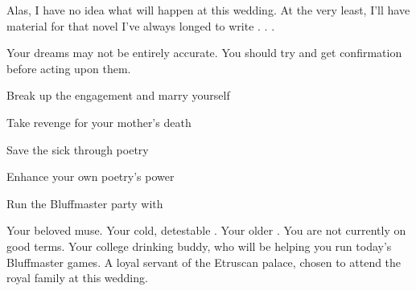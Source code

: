 \documentclass[char]{Kos}
\begin{document}
Alas, I have no idea what will happen at this wedding. At the very least, I'll have material for that novel I've always longed to write . . . 

\begin{itemz}[Notes]
  \item Your dreams may not be entirely accurate. You should try and get confirmation before acting upon them.
\end{itemz}

\begin{itemz}[Goals]
\item Break up the engagement and marry \cBride{} yourself
\item Take revenge for your mother's death
\item Save the sick through poetry
\item Enhance your own poetry's power
\item Run the Bluffmaster party with \cWard{}
\end{itemz}


\begin{contacts}
\contact{\cBride{}} Your beloved muse.
\contact{\cEtruriaKing{}} Your cold, detestable \cEtruriaKing{\parent}.
\contact{\cGroom{}} Your older \cGroom{\sibling}. You are not currently on good terms.
\contact{\cWard{}} Your college drinking buddy, who will be helping you run today's Bluffmaster games.
\contact{\cAssassin{}} A loyal servant of the Etruscan palace, chosen to attend the royal family at this wedding.
\end{contacts} 
\end{document}
